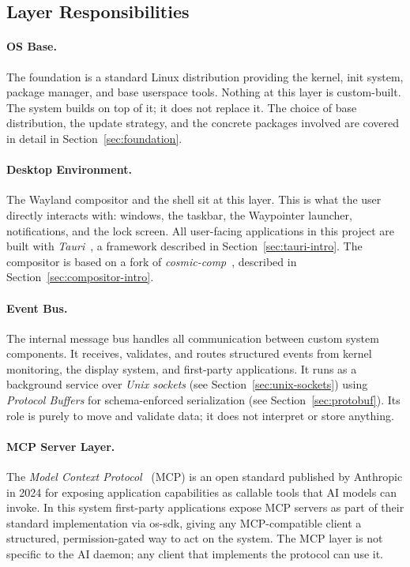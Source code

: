 \subsection{Layer Responsibilities}
\label{sec:layer-responsibilities}

\paragraph{OS Base.}
The foundation is a standard Linux distribution providing the kernel, init
system, package manager, and base userspace tools. Nothing at this layer is
custom-built. The system builds on top of it; it does not replace it. The choice
of base distribution, the update strategy, and the concrete packages involved
are covered in detail in Section~\ref{sec:foundation}.

\paragraph{Desktop Environment.}
The Wayland compositor and the shell sit at this layer. This is what the user
directly interacts with: windows, the taskbar, the Waypointer launcher,
notifications, and the lock screen. All user-facing applications in this project
are built with \emph{Tauri}~\cite{tauri}, a framework described in
Section~\ref{sec:tauri-intro}. The compositor is based on a fork of
\emph{cosmic-comp}~\cite{cosmic:comp}, described in
Section~\ref{sec:compositor-intro}.

\paragraph{Event Bus.}
The internal message bus handles all communication between custom system
components. It receives, validates, and routes structured events from kernel
monitoring, the display system, and first-party applications. It runs as a
background service over \emph{Unix sockets} (see Section~\ref{sec:unix-sockets})
using \emph{Protocol Buffers} for schema-enforced serialization (see
Section~\ref{sec:protobuf}). Its role is purely to move and validate data; it
does not interpret or store anything.

\paragraph{MCP Server Layer.}
The \emph{Model Context Protocol}~\cite{mcp:spec} (MCP) is an open standard
published by Anthropic in 2024 for exposing application capabilities as callable
tools that AI models can invoke. In this system first-party applications expose
MCP servers as part of their standard implementation via os-sdk, giving any
MCP-compatible client a structured, permission-gated way to act on the system.
The MCP layer is not specific to the AI daemon; any client that implements the
protocol can use it.

